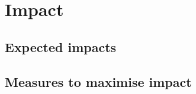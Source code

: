 \chapter{Impact}\label{chap:impact}

\section{Expected impacts}\label{sec:expected-impact}

  
  
  
  



\section{Measures to maximise impact}

